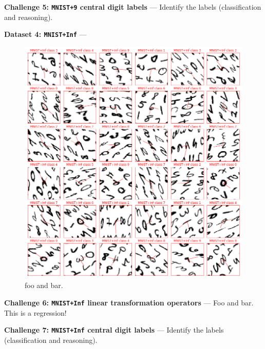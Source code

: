 \documentclass{article}
\renewcommand{\paragraph}[1]{\par\medskip\noindent\textbf{#1} ---}
\begin{document}
\paragraph{Challenge 5: \texttt{MNIST+9} central digit labels}
Identify the labels (classification and reasoning).

\paragraph{Dataset 4: \texttt{MNIST+Inf}}

\begin{figure}[t!]
\includegraphics[width=\textwidth]{../notebooks/MNIST+Inf.png}
\caption{foo and bar.\label{fig:Inf}}
\end{figure}

\paragraph{Challenge 6: \texttt{MNIST+Inf} linear transformation operators}
Foo and bar. This is a regression!

\paragraph{Challenge 7: \texttt{MNIST+Inf} central digit labels}
Identify the labels (classification and reasoning).
\end{document}
